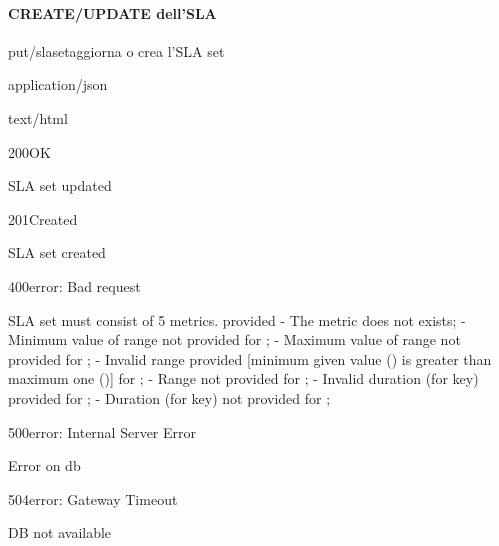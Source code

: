 \paragraph{CREATE/UPDATE dell'SLA }
    \begin{apiRoute}{put}{/slaset}{aggiorna o crea l'SLA set}
    	\begin{routeRequest}{application/json}
    		\begin{routeRequestBody}
    		\end{routeRequestBody}
    	\end{routeRequest}
    	\begin{routeResponse}{text/html}
    		\begin{routeResponseItem}{200}{OK}
    			\begin{routeResponseItemBody}
SLA set updated
    			\end{routeResponseItemBody}
    		\end{routeResponseItem}
                \begin{routeResponseItem}{201}{Created}
    			\begin{routeResponseItemBody}
SLA set created
    			\end{routeResponseItemBody}
    		\end{routeResponseItem}              
                \begin{routeResponseItem}{400}{error: Bad request}
    			\begin{routeResponseItemBody}
SLA set must consist of 5 metrics. {} provided
- The metric {} does not exists;
- Minimum value of range not provided for {};
- Maximum value of range not provided for {};
- Invalid range provided [minimum given value ({}) is greater than maximum one ({})] for {};
- Range not provided for {};
- Invalid duration (for key) provided for {};
- Duration (for key) not provided for {};
    			\end{routeResponseItemBody}
    		\end{routeResponseItem}
                \begin{routeResponseItem}{500}{error: Internal Server Error}
    			\begin{routeResponseItemBody}
Error on db
    			\end{routeResponseItemBody}
    		\end{routeResponseItem}
                \begin{routeResponseItem}{504}{error: Gateway Timeout}
    			\begin{routeResponseItemBody}
DB not available
    			\end{routeResponseItemBody}
    		\end{routeResponseItem}
    	\end{routeResponse}
    \end{apiRoute}



